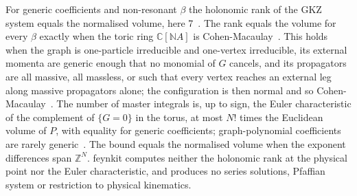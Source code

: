 \documentclass[11pt,a4paper]{article}
\begin{document}
For generic coefficients and non-resonant $\beta$ the holonomic rank of the GKZ system equals the normalised volume, here 7~\cite{adolphson1994,chestnov2022}. The rank equals the volume for every $\beta$ exactly when the toric ring $\mathbb{C}[\mathbb{N}A]$ is Cohen-Macaulay~\cite{mmw2005}. This holds when the graph is one-particle irreducible and one-vertex irreducible, its external momenta are generic enough that no monomial of $G$ cancels, and its propagators are all massive, all massless, or such that every vertex reaches an external leg along massive propagators alone; the configuration is then normal and so Cohen-Macaulay~\cite{klausen2023,tellander2023,walther2022}. The number of master integrals is, up to sign, the Euler characteristic of the complement of $\{G = 0\}$ in the torus, at most $N!$ times the Euclidean volume of $P$, with equality for generic coefficients; graph-polynomial coefficients are rarely generic~\cite{bbkp2017}. The bound equals the normalised volume when the exponent differences span $\mathbb{Z}^N$. feynkit computes neither the holonomic rank at the physical point nor the Euler characteristic, and produces no series solutions, Pfaffian system or restriction to physical kinematics.
\end{document}
